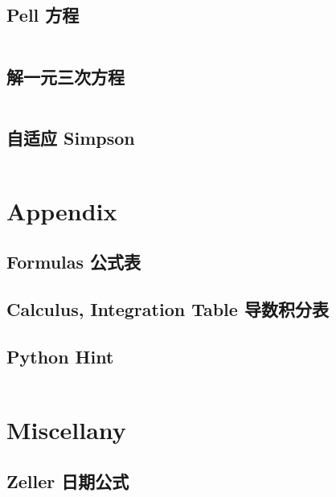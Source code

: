 \documentclass[titlepage, a4paper]{article}
\begin{document}
\begin{multicols}{2}
\begin{spacing}{0.6}
				\subsection{Pell 方程}
					\inputminted{cpp}{src/Math/Pell方程.cpp}
				\subsection{解一元三次方程}
					\inputminted{cpp}{src/Math/解一元三次方程.cpp}
				\subsection{自适应 Simpson}
					\inputminted{cpp}{src/Math/Simpson.cpp}
		
			
			\section{Appendix}
				\begin{spacing}{0.4}
				\subsection{Formulas 公式表}
					
				\subsection{Calculus, Integration Table 导数积分表}
					
					
				\subsection{Python Hint}
					\inputminted{python}{src/Miscellany/py.py}
				\end{spacing}

			\section{Miscellany}
				\subsection{Zeller 日期公式}
					\inputminted{cpp}{src/Miscellany/日期公式.cpp}

\end{spacing}
\end{multicols}
\end{document}
